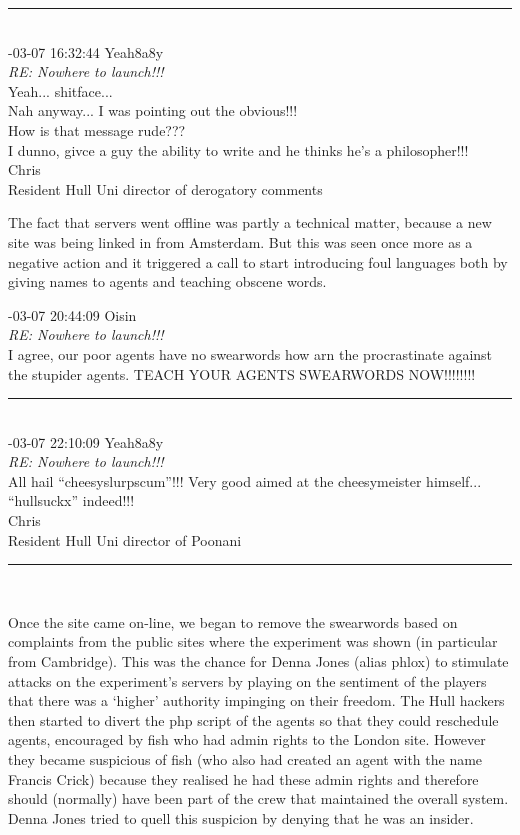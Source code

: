 \begin{mail}
\rule{0.8\textwidth}{.4pt}\\
{-03-07 16:32:44 Yeah8a8y}\\
{\itshape RE: Nowhere to launch!!!}\\
Yeah... shitface...\\
Nah anyway... I was pointing out the obvious!!!\\
How is that message rude???\\
I dunno, givce a guy the ability to write and he thinks he's a philosopher!!!\\
Chris\\
Resident Hull Uni director of derogatory comments\\
\end{mail}

The fact that servers went offline was partly a technical matter, because a new site was being linked in from Amsterdam. 
But this was seen once more as a negative action and it triggered a call to start 
introducing foul languages both by giving names to agents and teaching obscene words. 

\begin{mail}
{-03-07 20:44:09 Oisin}\\
{\itshape RE: Nowhere to launch!!!}\\
I agree, our poor agents have no swearwords how arn the procrastinate against the stupider agents. TEACH YOUR AGENTS SWEARWORDS NOW!!!!!!!! \\
\rule{0.8\textwidth}{.4pt}\\
{-03-07 22:10:09 Yeah8a8y}\\
{\itshape RE: Nowhere to launch!!!}\\
All hail ``cheesyslurpscum''!!!  Very good aimed at the cheesymeister himself... ``hullsuckx'' indeed!!!\\
Chris\\
Resident Hull Uni director of Poonani\\
\rule{0.8\textwidth}{.4pt}\\
\end{mail}

Once the site came on-line, we began to remove the swearwords based on complaints from the public sites where the 
experiment was shown (in particular from Cambridge). This was the chance for Denna Jones (alias phlox) to stimulate 
attacks on the experiment's servers by playing on the sentiment of the players that there was a `higher' authority 
impinging on their freedom. The Hull hackers then started to divert the php script of the agents so that they 
could reschedule agents, encouraged by fish who had admin rights to the London site. However they became suspicious
of fish (who also had created an agent with the name Francis Crick)
because they realised he had these admin rights and therefore should (normally) have been part of the 
crew that maintained the overall system. Denna Jones tried to quell this suspicion by denying that he was an insider. 

